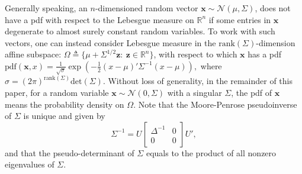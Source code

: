 \documentclass[twocolumn]{autart}    \usepackage{cite}
\begin{document}
{{Generally speaking, an $n$-dimensioned random vector
$\mathbf{x}\sim \mathcal{N}(\mu, \Sigma)$,
does not have a pdf
with respect to the Lebesgue measure
on $\mathbb{R}^{n}$
if some entries in $\mathbf{x}$ degenerate
to almost surely constant random variables.
To work with such vectors, one can instead consider Lebesgue measure in the $\mathrm{rank}(\Sigma)$-dimension affine subspace: $\Omega\triangleq\{\mu+\Sigma^{{1}/{2}}\mathbf{z}:~
\mathbf{z}\in\mathbb{R}^n\}$, with respect to which
$\mathbf{x}$ has a pdf
$\mathrm{pdf}(\mathbf{x},x)
=
\frac{1}{\sqrt{\sigma}}\exp{
\left(-\frac{1}{2}(x-\mu)'
\Sigma^{-1}(x-\mu)
\right)},$
where $\sigma=(2\pi)^{\mathrm{rank}(\Sigma)}\mathrm{det}(\Sigma)$.
Without loss of generality, in the remainder of this paper,
for a random variable
$\mathbf{x}\sim \mathcal{N}(0,\Sigma)$ with a singular $\Sigma$, the pdf of $\mathbf{x}$ means
the probability density on $\Omega$.
Note that the Moore-Penrose
pseudoinverse of $\Sigma$ is unique and given
by
\begin{equation}\label{eqn:eigen-decompostion}
\Sigma^{-1}=U\left[
\begin{array}{lc}
\Delta^{-1} & 0\\
 0&0\end{array}\right]U',
\end{equation}
and that the
pseudo-determinant of $\Sigma$ equals to the
product of all nonzero eigenvalues of $\Sigma$.


}}
\end{document}
